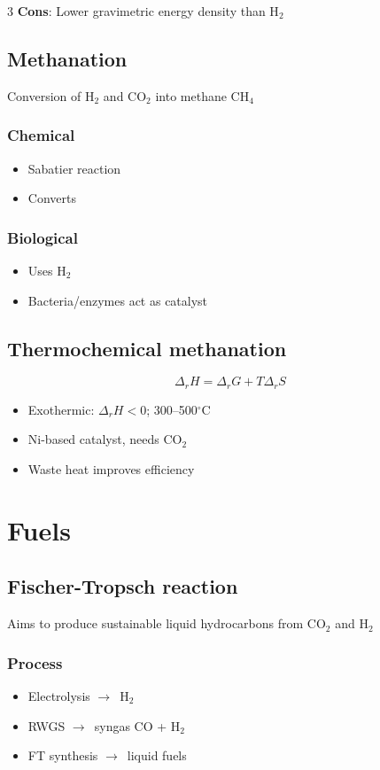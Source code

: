 \documentclass[9pt, landscape, a4paper]{article}
\let\mathto\to
\renewcommand{\to}{\ensuremath{\mathto}\ }
\newcommand{\cel}{\ensuremath{^\circ}C}
\begin{document}
\begin{multicols*}{3}
\textbf{Cons}: Lower gravimetric energy density than H$_2$

\subsection{Methanation}
Conversion of H$_2$ and CO$_2$ into methane CH$_4$
\subsubsection{Chemical}
\begin{itemize}
  \item Sabatier reaction
  \item Converts 
\end{itemize}

\subsubsection{Biological}
\begin{itemize}
  \item Uses H$_2$
  \item Bacteria/enzymes act as catalyst
\end{itemize}

\subsection{Thermochemical methanation}
\begin{center}
  \[\Delta_r H = \Delta_r G + T\Delta_r S\]
\end{center}
\begin{itemize}
  \item Exothermic: $\Delta_r H < 0$; 300--500\cel
  \item Ni-based catalyst, needs CO$_2$
  \item Waste heat improves efficiency
\end{itemize}

\section{Fuels}
\subsection{Fischer-Tropsch reaction}
Aims to produce sustainable liquid hydrocarbons  from CO$_2$ and H$_2$
\subsubsection{Process}
\begin{itemize}
  \item Electrolysis \to H$_2$
  \item RWGS \to syngas CO + H$_2$
  \item FT synthesis \to liquid fuels
\end{itemize}

\end{multicols*}
\end{document}
